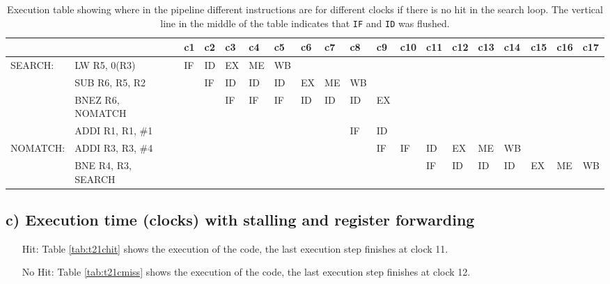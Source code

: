 \begin{landscape}
    \begin{table}[]
    \centering
    \begin{tabular}{lllllllllllllllllll}
    \hline
             &                                         & c1 & c2 & c3 & c4 & c5 & c6 & c7 & c8 & c9                      & c10 & c11 & c12 & c13 & c14 & c15 & c16 & c17 \\ \hline
    SEARCH:  & \multicolumn{1}{l|}{LW R5, 0(R3)}       & IF & ID & EX & ME & WB &    &    &    &                         &     &     &     &     &     &     &     &    \\
             & \multicolumn{1}{l|}{SUB R6, R5, R2}     &    & IF & ID & ID & ID & EX & ME & WB &                         &     &     &     &     &     &     &     &     \\
             & \multicolumn{1}{l|}{BNEZ R6, NOMATCH}   &    &    & IF & IF & IF & ID & ID & ID & \multicolumn{1}{l|}{EX} &     &     &     &     &     &     &     &     \\
             & \multicolumn{1}{l|}{ADDI R1, R1, \#1}   &    &    &    &    &    &    &    & IF & \multicolumn{1}{l|}{ID} &     &     &     &     &     &     &     &     \\
    NOMATCH: & \multicolumn{1}{l|}{ADDI R3, R3, \#4}   &    &    &    &    &    &    &    &    & \multicolumn{1}{l|}{IF} & IF  & ID  & EX  & ME  & WB  &     &     &     \\
             & \multicolumn{1}{l|}{BNE R4, R3, SEARCH} &    &    &    &    &    &    &    &    &                         &     & IF  & ID  & ID  & ID  & EX  & ME  & WB  \\ \hline
    \end{tabular}
    \caption{Execution table showing where in the pipeline different instructions are for different clocks if there is no hit in the search loop. The vertical line in the middle of the table indicates that \texttt{IF} and \texttt{ID} was flushed.}
    \label{tab:t21bmiss}
    \end{table}
\end{landscape}

\subsection{c) Execution time (clocks) with stalling and register forwarding}
\begin{itemize}
    \item[Hit: ] Table \ref{tab:t21chit} shows  the execution of the code, the
    last execution step finishes at clock 11.

    \item[No Hit: ] Table \ref{tab:t21cmiss} shows  the execution of the code, the
    last execution step finishes at clock 12.
\end{itemize}

